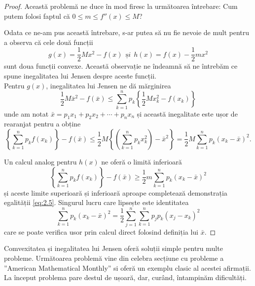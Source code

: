\documentclass[a4paper,12pt,oneside]{report}
\begin{document}
\begin{proof}
Această problemă ne duce în mod firesc la următoarea întrebare: Cum putem folosi faptul că \(0\leq m\leq {f}''\left ( x \right )\leq M \)?

Odata ce ne-am pus această întrebare, s-ar putea să nu fie nevoie de mult pentru a observa că cele două funcții
\begin{displaymath}
  g\left ( x \right ) = \frac{1}{2}Mx^{2} - f\left ( x \right )~~ și~~
h\left ( x \right ) = f\left ( x \right ) - \frac{1}{2}mx^{2}
\end{displaymath}
sunt doua funcții convexe.
Această observație ne îndeamnă să ne întrebăm ce spune inegalitatea lui Jensen despre aceste funcții.\\
Pentru \(g\left ( x \right )\), inegalitatea lui Jensen ne dă mărginirea
\begin{displaymath}
  \frac{1}{2}M\bar{x}^{2} - f\left ( \bar{x} \right )\leq \sum_{k = 1}^{n}p_{k}\left \{ \frac{1}{2}Mx_{k}^{2} - f\left ( x_{k} \right )\right \}
\end{displaymath}
unde am notat \(\bar{x} = p_{1}x_{1}+ p_{2}x_{2}+ \cdots + p_{n}x_{n}\) și această inegalitate este ușor de rearanjat  pentru a obține
\begin{displaymath}
  \left \{ \sum_{k = 1}^{n} p_{k}f\left ( x_{k} \right )\right \} - f\left (\bar{x}  \right )\leq \frac{1}{2}M\left \{ \left ( \sum_{k=1}^{n} p_{k}x_{k}^{2}\right ) - \bar{x}^{2} \right \} = \frac{1}{2}M\sum_{k = 1}^{n}p_{k}\left ( x_{k} - \bar{x} \right )^{2}.
\end{displaymath}

Un calcul analog pentru  \(h\left ( x \right )\) ne oferă o limită inferioară
\begin{displaymath}
  \left \{ \sum_{k = 1}^{n} p_{k}f\left ( x_{k} \right )\right \} - f\left (\bar{x}  \right )\geq \frac{1}{2}m\sum_{k = 1}^{n}p_{k}\left ( x_{k} - \bar{x} \right )^{2}
\end{displaymath}
și aceste limite superioară și inferioară aproape completează demonstrația egalității  \ref{eq:2.5}. Singurul lucru care lipsește este identitatea
\begin{displaymath}
  \sum_{k = 1}^{n}p_{k}\left ( x_{k} - \bar{x} \right )^{2} = \frac{1}{2}\sum_{j = 1}^{n}\sum_{k = 1}^{n} p _{j}p_{k}\left ( x_{j} - x_{k} \right )^{2}
\end{displaymath}
care se poate verifica usor prin calcul direct folosind definiția lui \(\bar{x}\).
\end{proof}
Comvexitatea și inegalitatea lui Jensen oferă soluții simple pentru multe probleme.
	Următoarea problemă vine din celebra secțiune cu probleme a ”American Mathematical Monthly” si oferă un exemplu clasic al acestei afirmații.
	La început problema pare destul de ușoară, dar, curând, întampinăm dificultăți.
\end{document}
